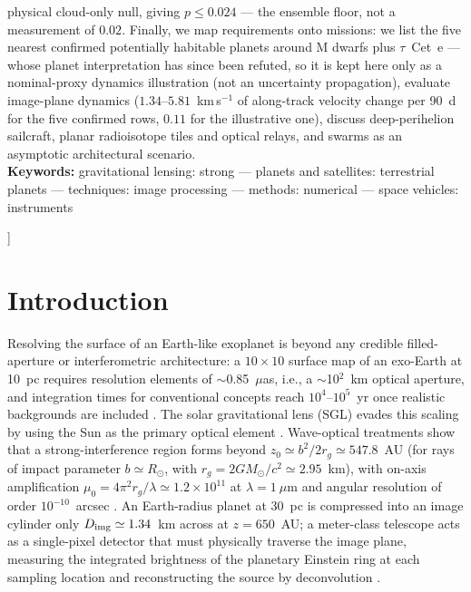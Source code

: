 \documentclass[twocolumn,10pt]{article}
\begin{document}
{\begin{center}
\begin{minipage}{0.86\textwidth}
physical cloud-only null, giving $p\le0.024$ --- the ensemble floor, not a
measurement of $0.02$. Finally, we map requirements onto missions: we list
the five nearest confirmed potentially habitable planets around M dwarfs plus
$\tau$~Cet~e --- whose planet interpretation has since been refuted, so it is
kept here only as a nominal-proxy dynamics illustration (not an uncertainty
propagation), evaluate image-plane dynamics ($1.34$--$5.81$~km\,s$^{-1}$ of
along-track velocity change per 90~d for the five confirmed rows, $0.11$ for the
illustrative one), discuss deep-perihelion sailcraft,
planar radioisotope tiles and optical relays, and swarms as an asymptotic
architectural scenario.
\\[2mm]
\textbf{Keywords:} gravitational lensing: strong --- planets and
satellites: terrestrial planets --- techniques: image processing ---
methods: numerical --- space vehicles: instruments
\end{minipage}
\end{center}
}]


\section{Introduction}
\label{sec:intro}

Resolving the surface of an Earth-like exoplanet is beyond any credible
filled-aperture or interferometric architecture: a $10\times10$ surface
map of an exo-Earth at 10~pc requires resolution elements of
$\sim$0.85~$\mu$as, i.e., a $\sim$10$^2$~km optical aperture, and
integration times for conventional concepts reach $10^4$--$10^5$~yr once
realistic backgrounds are included \citep{tur26direct}. The solar
gravitational lens (SGL) evades this scaling by using the Sun as the
primary optical element \citep{eshleman79,tt17}. Wave-optical treatments
show that a strong-interference region forms beyond
$z_0\simeq b^2/2r_g\simeq547.8$~AU (for rays of impact parameter
$b\simeq R_\odot$, with $r_g=2GM_\odot/c^2\simeq2.95$~km), with on-axis
amplification $\mu_0=4\pi^2 r_g/\lambda\simeq1.2\times10^{11}$ at
$\lambda=1~\mu$m and angular resolution of order $10^{-10}$~arcsec
\citep{tt17,tt19}. An Earth-radius planet at 30~pc is compressed into an
image cylinder only $D_{\rm img}\simeq1.34$~km across at $z=650$~AU; a
meter-class telescope acts as a single-pixel detector that must
physically traverse the image plane, measuring the integrated brightness
of the planetary Einstein ring at each sampling location and
reconstructing the source by deconvolution
\citep{tt20psf,toth21,tt22mnras}.
\end{document}
